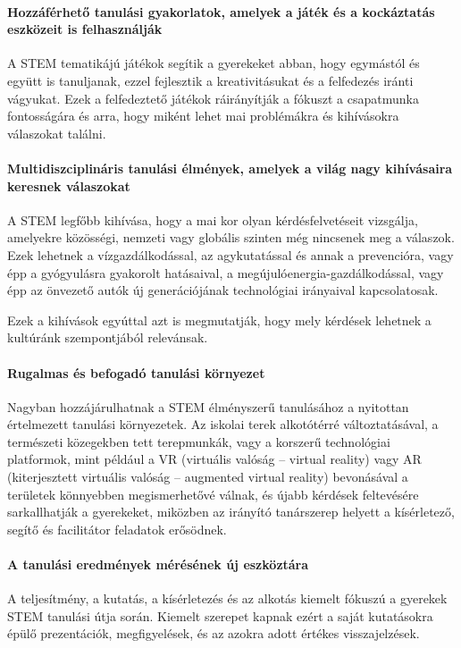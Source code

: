 \paragraph{Hozzáférhető tanulási gyakorlatok, amelyek a játék és a kockáztatás eszközeit is felhasználják} A STEM tematikájú játékok segítik a gyerekeket
abban, hogy egymástól és együtt is tanuljanak, ezzel fejlesztik a kreativitásukat és a felfedezés iránti vágyukat. Ezek a felfedeztető játékok ráirányítják a fókuszt a csapatmunka fontosságára és arra, hogy miként lehet mai problémákra és kihívásokra válaszokat találni.

\paragraph{Multidiszciplináris tanulási élmények, amelyek a világ nagy kihívásaira keresnek válaszokat} A STEM legfőbb kihívása, hogy a mai kor olyan
kérdésfelvetéseit vizsgálja, amelyekre közösségi, nemzeti vagy
globális\linebreak
szinten még nincsenek meg a válaszok. Ezek lehetnek a vízgazdálkodással, az agykutatással és annak a prevencióra, vagy épp a gyógyulásra gyakorolt hatásaival, a megújulóenergia-gazdálkodással, vagy épp az önvezető autók új generációjának technológiai irányaival kapcsolatosak. 

Ezek a kihívások egyúttal azt is megmutatják, hogy mely kérdések lehetnek a kultúránk szempontjából relevánsak.

\paragraph{Rugalmas és befogadó tanulási környezet} Nagyban
hozzájárulhatnak a\linebreak
STEM élményszerű tanulásához a nyitottan értelmezett tanulási környezetek. Az iskolai terek alkotótérré változtatásával, a természeti közegekben tett terepmunkák, vagy a korszerű technológiai platformok, mint például a VR (virtuális valóság – virtual reality) vagy AR (kiterjesztett virtuális valóság – augmented virtual reality) bevonásával a területek könnyebben megismerhetővé válnak, és újabb kérdések feltevésére sarkallhatják a gyerekeket, miközben az irányító tanárszerep helyett a kísérletező, segítő és facilitátor feladatok erősödnek.

\paragraph{A tanulási eredmények mérésének új eszköztára} A teljesítmény, a
kutatás, a kísérletezés és az alkotás kiemelt fókuszú a gyerekek STEM tanulási útja során. Kiemelt szerepet kapnak ezért a saját kutatásokra épülő prezentációk, megfigyelések, és az azokra adott értékes visszajelzések.

